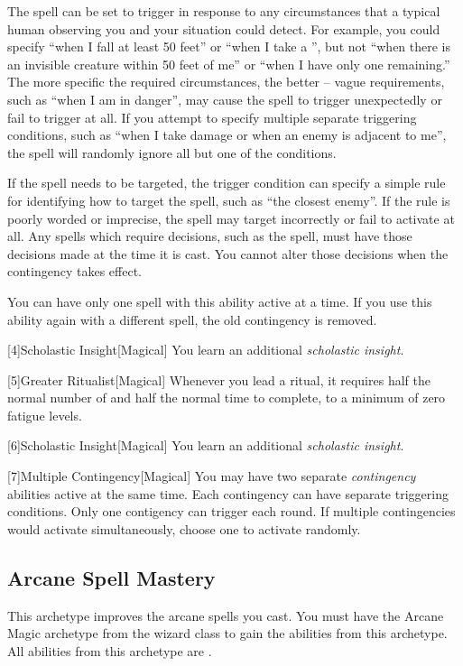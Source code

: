         The spell can be set to trigger in response to any circumstances that a typical human observing you and your situation could detect.
        For example, you could specify ``when I fall at least 50 feet'' or ``when I take a '', but not ``when there is an invisible creature within 50 feet of me'' or ``when I have only one  remaining.''
        The more specific the required circumstances, the better -- vague requirements, such as ``when I am in danger'', may cause the spell to trigger unexpectedly or fail to trigger at all.
        If you attempt to specify multiple separate triggering conditions, such as ``when I take damage or when an enemy is adjacent to me'', the spell will randomly ignore all but one of the conditions.

        If the spell needs to be targeted, the trigger condition can specify a simple rule for identifying how to target the spell, such as ``the closest enemy''.
        If the rule is poorly worded or imprecise, the spell may target incorrectly or fail to activate at all.
        Any spells which require decisions, such as the  spell, must have those decisions made at the time it is cast.
        You cannot alter those decisions when the contingency takes effect.

        You can have only one spell with this ability active at a time.
        If you use this ability again with a different spell, the old contingency is removed.

        [4]{Scholastic Insight}[Magical]
        You learn an additional \textit{scholastic insight}.

        [5]{Greater Ritualist}[Magical] Whenever you lead a ritual, it requires half the normal number of  and half the normal time to complete, to a minimum of zero fatigue levels.

        [6]{Scholastic Insight}[Magical]
        You learn an additional \textit{scholastic insight}.

        [7]{Multiple Contingency}[Magical] You may have two separate \textit{contingency} abilities active at the same time.
        Each contingency can have separate triggering conditions.
        Only one contigency can trigger each round.
        If multiple contingencies would activate simultaneously, choose one to activate randomly.

    \newpage
    \subsection{Arcane Spell Mastery}
        This archetype improves the arcane spells you cast.
        You must have the Arcane Magic archetype from the wizard class to gain the abilities from this archetype.
        All abilities from this archetype are .

